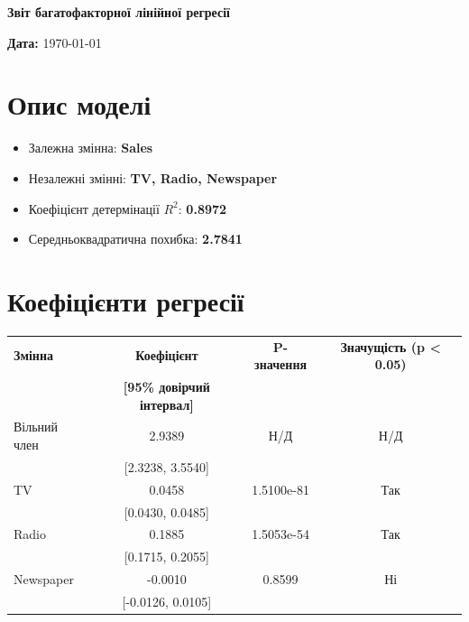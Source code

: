 \documentclass{article}
\begin{document}
    \begin{center}
    \Large\textbf{Звіт багатофакторної лінійної регресії}
    \end{center}

    \vspace{1cm}

    \textbf{Дата:} \today

    \vspace{0.5cm}

    \section{Опис моделі}

    \begin{itemize}
       \item Залежна змінна: \textbf{Sales}
       \item Незалежні змінні: \textbf{TV, Radio, Newspaper}
       \item Коефіцієнт детермінації $R^2$: \textbf{0.8972}
       \item Середньоквадратична похибка: \textbf{2.7841}
    \end{itemize}

    \vspace{0.5cm}

    \section{Коефіцієнти регресії}

   \renewcommand{\arraystretch}{1.5} %
    \begin{center}
    \begin{tabular}{lccc}
    \toprule
    \textbf{Змінна} & \textbf{Коефіцієнт} & \textbf{P-значення} & \textbf{Значущість (p < 0.05)} \\
     & \textbf{[95\% довірчий інтервал]} & & \\
    \midrule
    Вільний член & 2.9389 & Н/Д & Н/Д \\
     & [2.3238, 3.5540] & & \\
    TV & 0.0458 & 1.5100e-81 & Так \\
 & [0.0430, 0.0485] & & \\
Radio & 0.1885 & 1.5053e-54 & Так \\
 & [0.1715, 0.2055] & & \\
Newspaper & -0.0010 & 0.8599 & Ні \\
 & [-0.0126, 0.0105] & & \\

    \bottomrule
    \end{tabular}
    \end{center}
\end{document}
